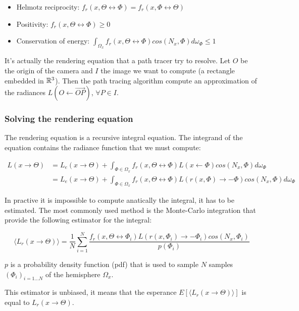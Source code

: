 \begin{itemize}
\item Helmotz reciprocity: $f_r(x, \Theta \leftrightarrow \Phi) = f_r(x, \Phi \leftrightarrow \Theta)$
\item Positivity: $f_r(x, \Theta \leftrightarrow \Phi) \geq 0$
\item Conservation of energy: $\int_{\Omega_x} f_r(x, \Theta \leftrightarrow \Phi) cos(N_x, \Phi) d\omega_\Phi \leq 1$
\end{itemize}

It's actually the rendering equation that a path tracer try to resolve. Let $O$ be the origin of the camera and $I$ the image we want to compute (a rectangle embedded in $\mathbb{R}^3$). Then the path tracing algorithm compute an approximation of the radiances $L(O \leftarrow \vec{OP})$, $\forall P \in I$.

\subsubsection{Solving the rendering equation}

The rendering equation is a recursive integral equation. The integrand of the equation contains the radiance function that we must compute:

\begin{align*}
L(x \rightarrow \Theta) &= L_e(x \rightarrow \Theta) + \int_{\Phi \in \Omega_x} f_r(x, \Theta \leftrightarrow \Phi) L(x \leftarrow \Phi) cos(N_x, \Phi) d\omega_\Phi \\
&= L_e(x \rightarrow \Theta) + \int_{\Phi \in \Omega_x} f_r(x, \Theta \leftrightarrow \Phi) L(r(x, \Phi) \rightarrow -\Phi) cos(N_x, \Phi) d\omega_\Phi
\end{align*}

In practive it is impossible to compute anatically the integral, it has to be estimated. The most commonly used method is the Monte-Carlo integration that provide the following estimator for the integral:

\begin{equation*}
\langle L_r(x \rightarrow \Theta) \rangle = \frac{1}{N} \sum_{i = 1}^{N} \frac{f_r(x, \Theta \leftrightarrow \Phi_i) L(r(x, \Phi_i) \rightarrow -\Phi_i) cos(N_x, \Phi_i)}{p(\Phi_i)}
\end{equation*}

$p$ is a probability density function (pdf) that is used to sample $N$ samples $(\Phi_i)_{i = 1...N}$ of the hemisphere $\Omega_x$.

This estimator is unbiased, it means that the esperance $E[\langle L_r(x \rightarrow \Theta) \rangle]$ is equal to $L_r(x \rightarrow \Theta)$. 

